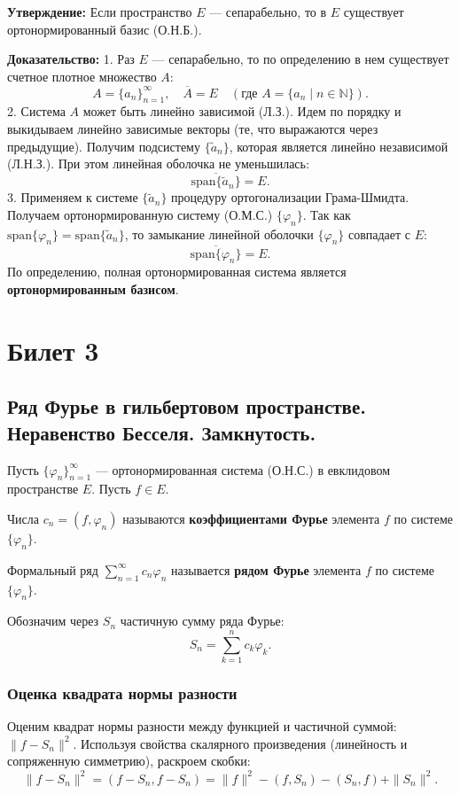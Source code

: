 \documentclass[12pt,a4paper,openany]{book}
\begin{document}
\textbf{Утверждение:}
Если пространство $E$ — сепарабельно, то в $E$ существует ортонормированный базис (О.Н.Б.).

\textbf{Доказательство:}
1. Раз $E$ — сепарабельно, то по определению в нем существует счетное плотное множество $A$:
\[
A = \{a_n\}_{n=1}^\infty, \quad \overline{A} = E \quad (\text{где } A = \{a_n \mid n \in \mathbb{N}\}).
\]
2. Система $A$ может быть линейно зависимой (Л.З.).
Идем по порядку и выкидываем линейно зависимые векторы (те, что выражаются через предыдущие).
Получим подсистему $\{\tilde{a}_n\}$, которая является линейно независимой (Л.Н.З.).
При этом линейная оболочка не уменьшилась:
\[
\overline{\text{span}\{\tilde{a}_n\}} = E.
\]
3. Применяем к системе $\{\tilde{a}_n\}$ процедуру ортогонализации Грама-Шмидта.
Получаем ортонормированную систему (О.М.С.) $\{\varphi_n\}$.
Так как $\text{span}\{\varphi_n\} = \text{span}\{\tilde{a}_n\}$, то замыкание линейной оболочки $\{\varphi_n\}$ совпадает с $E$:
\[
\overline{\text{span}\{\varphi_n\}} = E.
\]
По определению, полная ортонормированная система является \textbf{ортонормированным базисом}.
\chapter{Билет 3}



\section{Ряд Фурье в гильбертовом пространстве. Неравенство Бесселя. Замкнутость.}

Пусть $\{\varphi_n\}_{n=1}^\infty$ — ортонормированная система (О.Н.С.) в евклидовом пространстве $E$.
Пусть $f \in E$.

Числа $c_n = (f, \varphi_n)$ называются \textbf{коэффициентами Фурье} элемента $f$ по системе $\{\varphi_n\}$.

Формальный ряд $\sum_{n=1}^\infty c_n \varphi_n$ называется \textbf{рядом Фурье} элемента $f$ по системе $\{\varphi_n\}$.

Обозначим через $S_n$ частичную сумму ряда Фурье:
\[
S_n = \sum_{k=1}^n c_k \varphi_k.
\]

\subsection{Оценка квадрата нормы разности}

Оценим квадрат нормы разности между функцией и частичной суммой: $\|f - S_n\|^2$.
Используя свойства скалярного произведения (линейность и сопряженную симметрию), раскроем скобки:
\[
\|f - S_n\|^2 = (f - S_n, f - S_n) = \|f\|^2 - (f, S_n) - (S_n, f) + \|S_n\|^2.
\]
\end{document}
